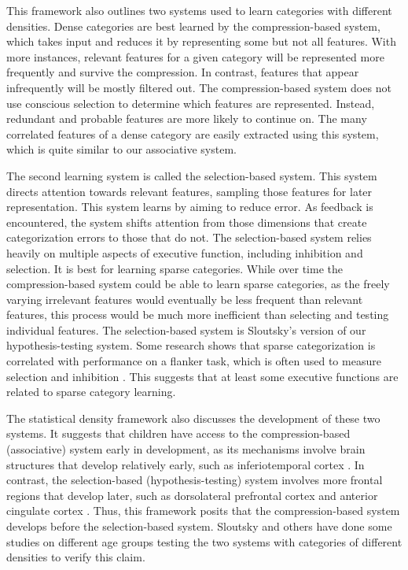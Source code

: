 \documentclass[../dissertation.tex]{subfiles}
\begin{document}
	This framework also outlines two systems used to learn categories with different densities. Dense categories are best learned by the compression-based system, which takes input and reduces it by representing some but not all features. With more instances, relevant features for a given category will be represented more frequently and survive the compression. In contrast, features that appear infrequently will be mostly filtered out. The compression-based system does not use conscious selection to determine which features are represented. Instead, redundant and probable features are more likely to continue on. The many correlated features of a dense category are easily extracted using this system, which is quite similar to our associative system. \par 
	The second learning system is called the selection-based system. This system directs attention towards relevant features, sampling those features for later representation. This system learns by aiming to reduce error. As feedback is encountered, the system shifts attention from those dimensions that create categorization errors to those that do not. The selection-based system relies heavily on multiple aspects of executive function, including inhibition and selection. It is best for learning sparse categories. While over time the compression-based system could be able to learn sparse categories, as the freely varying irrelevant features would eventually be less frequent than relevant features, this process would be much more inefficient than selecting and testing individual features. The selection-based system is Sloutsky's version of our hypothesis-testing system. Some research shows that sparse categorization is correlated with performance on a flanker task, which is often used to measure selection and inhibition \citep{Perry2016}. This suggests that at least some executive functions are related to sparse category learning. \par
	The statistical density framework also discusses the development of these two systems. It suggests that children have access to the compression-based (associative) system early in development, as its mechanisms involve brain structures that develop relatively early, such as inferiotemporal cortex \citep{Rodman1994}. In contrast, the selection-based (hypothesis-testing) system involves more frontal regions that develop later, such as dorsolateral prefrontal cortex and anterior cingulate cortex \citep{Eshel2007, Lewis1997, Segalowitz2004}. Thus, this framework posits that the compression-based system develops before the selection-based system. Sloutsky and others have done some studies on different age groups testing the two systems with categories of different densities to verify this claim. \par 
\end{document}
